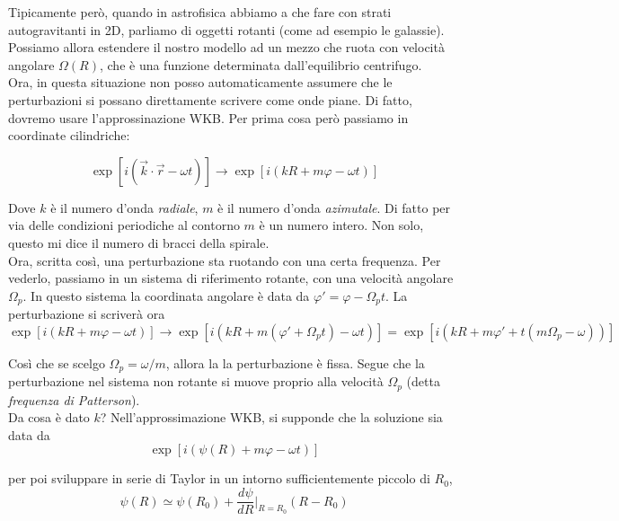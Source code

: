 \documentclass{report}
\begin{document}
Tipicamente però, quando in astrofisica abbiamo a che fare con strati autogravitanti in 2D, parliamo di oggetti rotanti (come ad esempio le galassie). Possiamo allora estendere il nostro modello ad un mezzo che ruota con velocità angolare $\Omega(R)$, che è una funzione determinata dall'equilibrio centrifugo. \\

Ora, in questa situazione non posso automaticamente assumere che le perturbazioni si possano direttamente scrivere come onde piane. Di fatto, dovremo usare l'approssinazione WKB. Per prima cosa però passiamo in coordinate cilindriche: 

\begin{equation}
    \exp[i(\vec{k}\cdot \vec{r} - \omega t)] \rightarrow \exp[i(kR + m\varphi - \omega t)]
\end{equation}

Dove $k$ è il numero d'onda \emph{radiale}, $m$ è il numero d'onda \emph{azimutale}. Di fatto per via delle condizioni periodiche al contorno $m$ è un numero intero. Non solo, questo mi dice il numero di bracci della spirale. \\

Ora, scritta così, una perturbazione sta ruotando con una certa frequenza. Per vederlo, passiamo in un sistema di riferimento rotante, con una velocità angolare $\Omega_p$. In questo sistema la coordinata angolare è data da $\varphi' = \varphi - \Omega_pt$. La perturbazione si scriverà ora 
\begin{equation}
    \exp[i(kR + m\varphi - \omega t)] \rightarrow \exp[i(kR + m(\varphi' + \Omega_pt) - \omega t)] = \exp[i(kR + m\varphi' + t(m\Omega_p -\omega))]  
\end{equation}

Così che se scelgo $\Omega_p = \omega/m$, allora la la perturbazione è fissa. Segue che la perturbazione nel sistema non rotante si muove proprio alla velocità $\Omega_p$ (detta \emph{frequenza di Patterson}). \\

Da cosa è dato $k$? Nell'approssimazione WKB, si supponde che la soluzione sia data da
\begin{equation}
    \exp{[i(\psi(R) + m\varphi -\omega t)]}
\end{equation}

per poi sviluppare in serie di Taylor in un intorno sufficientemente piccolo di $R_0$, 
\begin{equation}
    \psi(R) \simeq \psi(R_0) + \dfrac{d\psi}{dR}\biggr|_{R=R_0}(R-R_0)
\end{equation}
\end{document}
